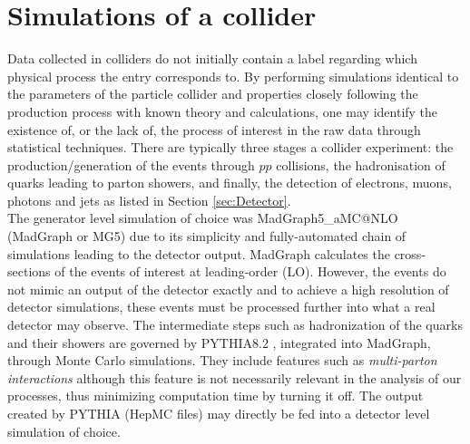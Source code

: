 \section{Simulations of a collider}
\label{sec:Sims}
Data collected in colliders do not initially contain a label regarding which physical process the entry corresponds to. By performing simulations identical to the parameters of the particle collider and properties closely following the production process with known theory and calculations, one may identify the existence of, or the lack of, the process of interest in the raw data through statistical techniques. There are typically three stages a collider experiment: the production/generation of the events through $pp$ collisions, the hadronisation of quarks leading to parton showers, and finally, the detection of electrons, muons, photons and jets as listed in Section \ref{sec:Detector}. \\

The generator level simulation of choice was MadGraph5\_aMC@NLO \cite{alwall2014automated} (MadGraph or MG5) due to its simplicity and fully-automated chain of simulations leading to the detector output. MadGraph calculates the cross-sections of the events of interest at leading-order (LO). However, the events do not mimic an output of the detector exactly and to achieve a high resolution of detector simulations, these events must be processed further into what a real detector may observe. The intermediate steps such as hadronization of the quarks and their showers are governed by PYTHIA8.2 \cite{sjostrand2015introduction}, integrated into MadGraph, through Monte Carlo simulations. They include features such as \textit{multi-parton interactions} although this feature is not necessarily relevant in the analysis of our processes, thus minimizing computation time by turning it off. The output created by PYTHIA (HepMC files) may directly be fed into a detector level simulation of choice. \\

